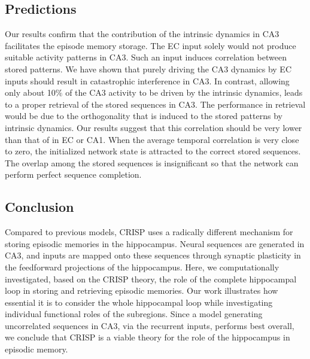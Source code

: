 \documentclass[utf8]{frontiersSCNS} %
\begin{document}
\subsection{Predictions}
Our results confirm that the contribution of the intrinsic dynamics in CA3 facilitates the episode memory storage. 
%
The EC input solely would not produce suitable activity patterns in CA3. Such an input induces correlation between stored patterns.
%
We have shown that purely driving the CA3 dynamics by EC inputs should result in catastrophic interference in CA3.
%
In contrast, allowing only about 10$\%$ of the CA3 activity to be driven by the intrinsic dynamics, leads to a proper retrieval of the stored sequences in CA3. 
%
The performance in retrieval would be due to the orthogonality that is induced to the stored patterns by intrinsic dynamics. 
%
Our results suggest that this correlation should be very lower than that of in EC or CA1.
%
When the average temporal correlation is very close to zero, the initialized network state is attracted to the correct stored sequences. The overlap among the stored sequences is insignificant so that the network can perform perfect sequence completion.
%

\subsection{Conclusion} 
Compared to previous models, CRISP uses a radically different mechanism for storing episodic memories in the hippocampus. Neural sequences are generated in CA3, and inputs are mapped onto these sequences through synaptic plasticity in the feedforward projections of the hippocampus. Here, we computationally investigated, based on the CRISP theory, the role of the complete hippocampal loop in storing and retrieving episodic memories. Our work illustrates how essential it is to consider the whole hippocampal loop while investigating individual functional roles of the subregions. Since a model generating uncorrelated sequences in CA3, via the recurrent inputs, performs best overall, we conclude that CRISP is a viable theory for the role of the hippocampus in episodic memory.


\end{document}
